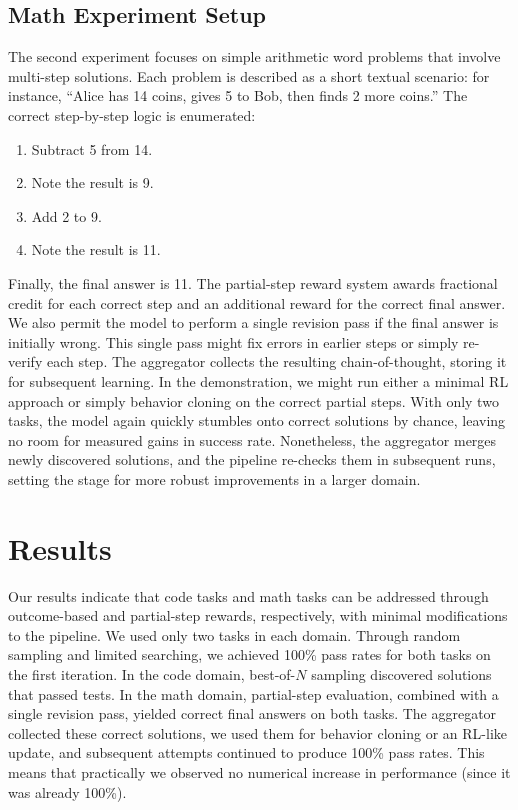 \documentclass{article}
\begin{document}
\subsection{Math Experiment Setup}
The second experiment focuses on simple arithmetic word problems that involve multi-step solutions. Each problem is described as a short textual scenario: for instance, “Alice has 14 coins, gives 5 to Bob, then finds 2 more coins.” The correct step-by-step logic is enumerated:
\begin{enumerate}
\item Subtract 5 from 14.
\item Note the result is 9.
\item Add 2 to 9.
\item Note the result is 11.
\end{enumerate}
Finally, the final answer is 11. The partial-step reward system awards fractional credit for each correct step and an additional reward for the correct final answer. We also permit the model to perform a single revision pass if the final answer is initially wrong. This single pass might fix errors in earlier steps or simply re-verify each step. The aggregator collects the resulting chain-of-thought, storing it for subsequent learning. In the demonstration, we might run either a minimal RL approach or simply behavior cloning on the correct partial steps. With only two tasks, the model again quickly stumbles onto correct solutions by chance, leaving no room for measured gains in success rate. Nonetheless, the aggregator merges newly discovered solutions, and the pipeline re-checks them in subsequent runs, setting the stage for more robust improvements in a larger domain.

\section{Results}
Our results indicate that code tasks and math tasks can be addressed through outcome-based and partial-step rewards, respectively, with minimal modifications to the pipeline. We used only two tasks in each domain. Through random sampling and limited searching, we achieved 100\% pass rates for both tasks on the first iteration. In the code domain, best-of-\(N\) sampling discovered solutions that passed tests. In the math domain, partial-step evaluation, combined with a single revision pass, yielded correct final answers on both tasks. The aggregator collected these correct solutions, we used them for behavior cloning or an RL-like update, and subsequent attempts continued to produce 100\% pass rates. This means that practically we observed no numerical increase in performance (since it was already 100\%).
\end{document}
